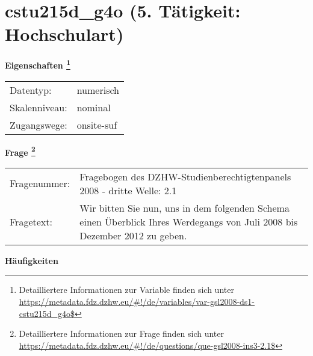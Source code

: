 
    \setcounter{footnote}{0}

    \vspace*{-1.8cm}
	\section{cstu215d\_g4o (5. Tätigkeit: Hochschulart)}
	\label{section:cstu215d_g4o}



    \vspace*{0.5cm}
    \noindent\textbf{Eigenschaften
	\footnote{Detailliertere Informationen zur Variable finden sich unter
		\url{https://metadata.fdz.dzhw.eu/\#!/de/variables/var-gsl2008-ds1-cstu215d_g4o$}}}\\
	\begin{tabularx}{\hsize}{@{}lX}
	Datentyp: & numerisch \\
	Skalenniveau: & nominal \\
	Zugangswege: &
	  onsite-suf
 \\
    \end{tabularx}



				\vspace*{0.5cm}
                \noindent\textbf{Frage
	                \footnote{Detailliertere Informationen zur Frage finden sich unter
		              \url{https://metadata.fdz.dzhw.eu/\#!/de/questions/que-gsl2008-ins3-2.1$}}}\\
				\begin{tabularx}{\hsize}{@{}lX}
					Fragenummer: &
					  Fragebogen des DZHW-Studienberechtigtenpanels 2008 - dritte Welle:
					  2.1
 \\
					Fragetext: & Wir bitten Sie nun, uns in dem folgenden Schema einen Überblick Ihres Werdegangs von Juli 2008 bis Dezember 2012 zu geben. \\
				\end{tabularx}





        		\vspace*{0.5cm}
                \noindent\textbf{Häufigkeiten}

